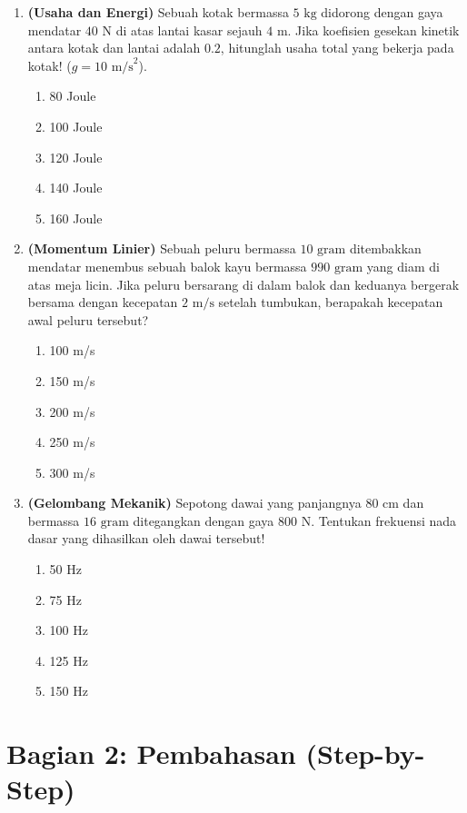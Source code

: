 \documentclass[12pt,a4paper]{article}
\begin{document}
\begin{enumerate}
    \item \textbf{(Usaha dan Energi)} Sebuah kotak bermassa $5 \text{ kg}$ didorong dengan gaya mendatar $40 \text{ N}$ di atas lantai kasar sejauh $4 \text{ m}$. Jika koefisien gesekan kinetik antara kotak dan lantai adalah $0.2$, hitunglah usaha total yang bekerja pada kotak! ($g = 10 \text{ m/s}^2$).
    \begin{enumerate}[label=\alph*.]
        \item 80 Joule
        \item 100 Joule
        \item 120 Joule
        \item 140 Joule
        \item 160 Joule
    \end{enumerate}

    \item \textbf{(Momentum Linier)} Sebuah peluru bermassa $10 \text{ gram}$ ditembakkan mendatar menembus sebuah balok kayu bermassa $990 \text{ gram}$ yang diam di atas meja licin. Jika peluru bersarang di dalam balok dan keduanya bergerak bersama dengan kecepatan $2 \text{ m/s}$ setelah tumbukan, berapakah kecepatan awal peluru tersebut?
    \begin{enumerate}[label=\alph*.]
        \item 100 m/s
        \item 150 m/s
        \item 200 m/s
        \item 250 m/s
        \item 300 m/s
    \end{enumerate}

    \item \textbf{(Gelombang Mekanik)} Sepotong dawai yang panjangnya $80 \text{ cm}$ dan bermassa $16 \text{ gram}$ ditegangkan dengan gaya $800 \text{ N}$. Tentukan frekuensi nada dasar yang dihasilkan oleh dawai tersebut!
    \begin{enumerate}[label=\alph*.]
        \item 50 Hz
        \item 75 Hz
        \item 100 Hz
        \item 125 Hz
        \item 150 Hz
    \end{enumerate}
\end{enumerate}

\newpage
\section*{Bagian 2: Pembahasan (Step-by-Step)}
\end{document}
